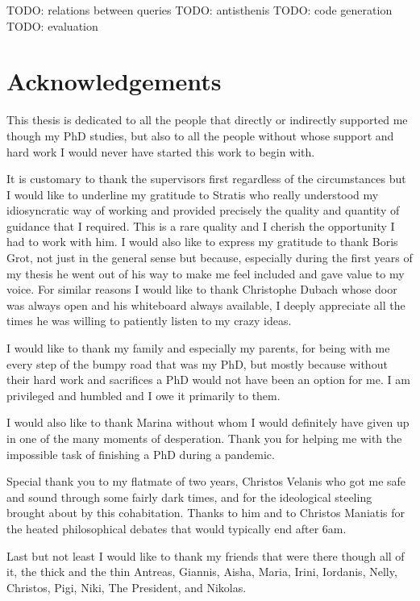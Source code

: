 \begin{precontent}
TODO: relations between queries
TODO: antisthenis
TODO: code generation
TODO: evaluation

\chapter{Acknowledgements}%

This thesis is dedicated to all the people that directly or indirectly
supported me though my PhD studies, but also to all the people
without whose support and hard work I would never have started this
work to begin with.

It is customary to thank the supervisors first regardless of the
circumstances but I would like to underline my gratitude to Stratis
who really understood my idiosyncratic way of working and provided
precisely the quality and quantity of guidance that I required. This
is a rare quality and I cherish the opportunity I had to work with
him. I would also like to express my gratitude to thank Boris Grot,
not just in the general sense but because, especially during the first
years of my thesis he went out of his way to make me feel included and
gave value to my voice. For similar reasons I would like to thank
Christophe Dubach whose door was always open and his whiteboard always
available, I deeply appreciate all the times he was willing to
patiently listen to my crazy ideas.

I would like to thank my family and especially my parents, for being
with me every step of the bumpy road that was my PhD, but mostly
because without their hard work and sacrifices a PhD would not have
been an option for me. I am privileged and humbled and I owe it
primarily to them.

I would also like to thank Marina without whom I would definitely have
given up in one of the many moments of desperation. Thank you for
helping me with the impossible task of finishing a PhD during a
pandemic.

Special thank you to my flatmate of two years, Christos Velanis who
got me safe and sound through some fairly dark times, and for the
ideological steeling brought about by this cohabitation. Thanks to him
and to Christos Maniatis for the heated philosophical debates that
would typically end after 6am.

Last but not least I would like to thank my friends that were there
though all of it, the thick and the thin Antreas, Giannis, Aisha,
Maria, Irini, Iordanis, Nelly, Christos, Pigi, Niki, The President,
and Nikolas.






\end{precontent}


\tableofcontents

\cleardoublepage
{}
{}
\listoffigures
\listoflistings

\cleardoublepage%
